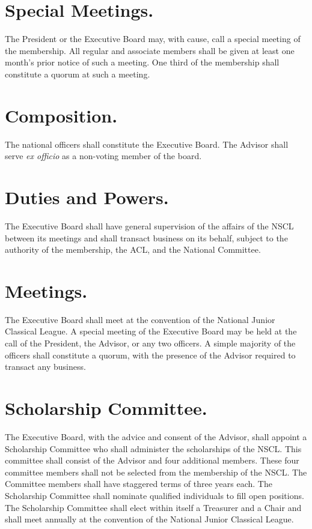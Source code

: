 \documentclass{bylaws}
\newcommand{\NSCL}{\textsc{NSCL}\xspace}
\newcommand{\ACL}{\textsc{ACL}\xspace}
\begin{document}
\begin{linenumbers}[1]
  \section{Special Meetings.}
  The President or the Executive Board may, with cause, call a special
  meeting of the membership. All regular and associate members shall be
  given at least one month's prior notice of such a meeting. One third
  of the membership shall constitute a quorum at such a meeting.\\ 


  \section{Composition.}
  The national officers shall constitute the Executive Board. The
  Advisor shall serve \textit{ex officio} as a non-voting member of the
  board.\\

  \section{Duties and Powers.} The Executive Board shall have general
  supervision of the affairs of the \NSCL between its meetings and shall
  transact business on its behalf, subject to the authority of the
  membership, the \ACL, and the National Committee.\\

  \section{Meetings.} The Executive Board shall meet at the convention
  of the National Junior Classical League. A special meeting of the
  Executive Board may be held at the call of the President, the Advisor,
  or any two officers. A simple majority of the officers shall
  constitute a quorum, with the presence of the Advisor required to
  transact any business.\\


  \section{Scholarship Committee.} 
  The Executive Board, with the advice and consent of the Advisor, shall
  appoint a Scholarship Committee who shall administer the scholarships
  of the \NSCL. This committee shall consist of the Advisor and four
  additional members. These four committee members shall not be selected
  from the membership of the \NSCL. The Committee members shall have
  staggered terms of three years each. The Scholarship Committee shall
  nominate qualified individuals to fill open positions. The Scholarship
  Committee shall elect within itself a Treasurer and a Chair and shall
  meet annually at the convention of the National Junior Classical
  League.\\


\end{linenumbers}
\end{document}
